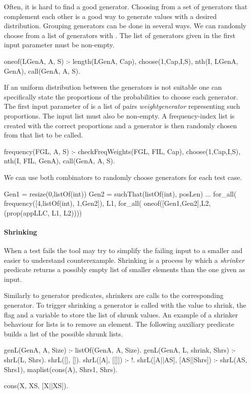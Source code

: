                                                         


Often, it is hard to find a good generator.
%
Choosing from a set of generators that complement each other
is a good way to generate values with a desired distribution.
%
Grouping generators can be done in several ways.
%
We can randomly choose from a list of generators with .
%
The list of generators given in the first input parameter must be non-empty.
%
\begin{yapcode}
 oneof(LGenA, A, S) :- length(LGenA, Cap), choose(1,Cap,I,S),
   nth(I, LGenA, GenA), call(GenA, A, S).
\end{yapcode}
%
If an uniform distribution between the generators is not suitable one can
specifically state the proportions of the probabilities to choose each
generator.
%
The first input parameter of  is a list of pairs
\yap{\{}\emph{weight}\yap{,}\emph{generator}\yap{\}} representing such
proportions.
%
The input list must also be non-empty.
%
A frequency-index list is created with the correct proportions and a
generator is then randomly chosen from that list to be called.
%
\begin{yapcode}
 frequency(FGL, A, S) :- checkFreqWeights(FGL, FIL, Cap),
   choose(1,Cap,I,S), nth(I, FIL, GenA), call(GenA, A, S).
\end{yapcode}
%
We can use both combinators to randomly choose generators for each test case.
%
\begin{yapcode}
 Gen1 = resize(0,listOf(int))
 Gen2 = suchThat(listOf(int), posLen)
 ...
   for_all( frequency([{4,listOf(int)}, {1,Gen2}]),  L1,
     for_all( oneof([Gen1,Gen2],L2, (prop({appLLC, L1, L2}))))
\end{yapcode}






\paragraph{\bf Shrinking}

When a test fails the tool may try to simplify the failing input to a
smaller and easier to understand counterexample.
%
Shrinking is a process by which a \emph{shrinker} predicate returns a
possibly empty list of smaller elements than the one given as input.


Similarly to generator predicates, shrinkers are calls to the
corresponding generator.
%
To trigger shrinking a generator is called with the value to shrink, the
flag  and a variable to store the list of shrunk values.
%
An example of a shrinker behaviour for lists is to remove an
element.
%
The following auxiliary predicate builds a list of the possible shrunk
lists.
%
\begin{yapcode}
 genL(GenA, A, Size) :- listOf(GenA, A, Size).
 genL(GenA, L, shrink, Shrs) :-  shrL(L, Shrs).
 shrL([], []).
 shrL([A], [[]]) :- !.
 shrL([A||AS], [AS||Shrs]) :-
   shrL(AS, Shrs1), maplist(cons(A), Shrs1, Shrs).

 cons(X, XS, [X||XS]).
\end{yapcode}


